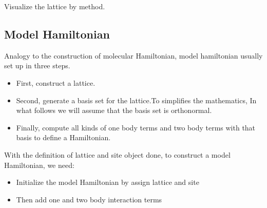 \documentclass[letterpaper,10pt,english]{sphinxmanual}
\begin{document}
\begin{sphinxVerbatim}[commandchars=\\\{\}]
      \PYG{p}{[}\PYG{p}{]}
     

  
\end{sphinxVerbatim}

Visualize the lattice by  method.

\begin{figure}[htbp]
\centering

\noindent{}
\end{figure}


\subsection{Model Hamiltonian}
\label{\detokenize{user_model_system:model-hamiltonian}}
Analogy to the construction of molecular Hamiltonian, model hamiltonian usually set up
in three steps.
\begin{itemize}
\item {} 
First, construct a lattice.

\item {} 
Second, generate a basis set for the lattice.To simplifies the mathematics, In what
follows we will assume that the basis set is orthonormal.

\item {} 
Finally, compute all kinds of one body terms and two body terms with that basis
to define a Hamiltonian.

\end{itemize}

With the definition of lattice and site object done, to construct a model Hamiltonian, we need:
\begin{itemize}
\item {} 
Initialize the model Hamiltonian by assign lattice and site

\end{itemize}

%
\begin{sphinxVerbatim}[commandchars=\\\{\}]
  
\end{sphinxVerbatim}
\begin{itemize}
\item {} 
Then add one and two body interaction terms

\end{itemize}
\end{document}
